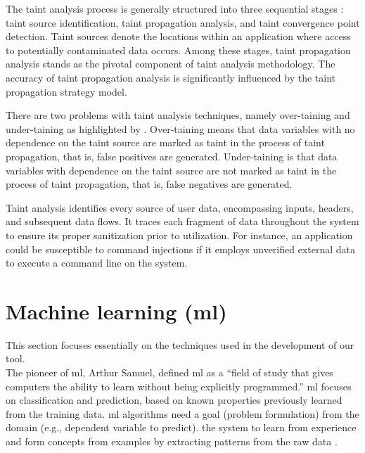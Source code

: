The taint analysis process is generally structured into three sequential stages \cite{REN_Yuzhu2019}: taint source identification, taint propagation analysis, and taint convergence point detection. Taint sources denote the locations within an application where access to potentially contaminated data occurs. Among these stages, taint propagation analysis stands as the pivotal component of taint analysis methodology. The accuracy of taint propagation analysis is significantly influenced by the taint propagation strategy model.

There are two problems with taint analysis techniques, namely over-taining and under-taining as highlighted by \cite{REN_Yuzhu2019}. Over-taining means that data variables with no dependence on the taint source are marked as taint in the process of taint propagation, that is, false positives are generated. Under-taining is that data variables with dependence on the taint source are not marked as taint in the process of taint propagation, that is, false negatives are generated.

Taint analysis identifies every source of user data, encompassing inputs, headers, and subsequent data flows. It traces each fragment of data throughout the system to ensure its proper sanitization prior to utilization. For instance, an application could be susceptible to command injections if it employs unverified external data to execute a command line on the system.




\section{Machine learning (\gls{ml})} %
\label{sec: Machine_learning}

This section focuses essentially on the techniques used in the development of our tool.\\

The pioneer of \gls{ml}, Arthur Samuel, defined \gls{ml} as a “field of study that gives computers the ability to learn without being explicitly programmed.” \gls{ml} focuses on classification and prediction, based on known properties previously learned from the training data. \gls{ml} algorithms need a goal (problem formulation) from the domain (e.g., dependent variable to predict). the system to learn from experience and form concepts from examples by extracting patterns from the raw data \cite{Goodfellow_et_al_2016}.

